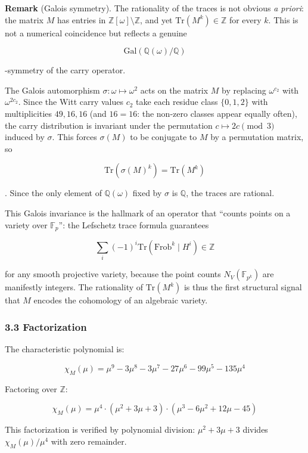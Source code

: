 \documentclass[
  11pt,
]{article}
\begin{document}
\textbf{Remark} (Galois symmetry). The rationality of the traces is not obvious
\emph{a priori}: the matrix \(M\) has entries in
\(\mathbb{Z}[\omega] \setminus \mathbb{Z}\), and yet
\(\mathrm{Tr}(M^k) \in \mathbb{Z}\) for every \(k\). This is not a numerical
coincidence but reflects a genuine

\[\mathrm{Gal}(\mathbb{Q}(\omega)/\mathbb{Q})\]

-symmetry of the carry operator.

The Galois automorphism \(\sigma: \omega \mapsto \omega^2\) acts on the matrix
\(M\) by replacing \(\omega^{c_2}\) with \(\omega^{2c_2}\). Since the Witt carry
values \(c_2\) take each residue class \(\lbrace{}0, 1, 2\rbrace{}\) with
multiplicities \(49, 16, 16\) (and \(16 = 16\): the non-zero classes appear
equally often), the carry distribution is invariant under the permutation
\(c \mapsto 2c \pmod{3}\) induced by \(\sigma\). This forces \(\sigma(M)\) to be
conjugate to \(M\) by a permutation matrix, so

\[\mathrm{Tr}(\sigma(M)^k) = \mathrm{Tr}(M^k)\]

. Since the only element of \(\mathbb{Q}(\omega)\) fixed by \(\sigma\) is
\(\mathbb{Q}\), the traces are rational.

This Galois invariance is the hallmark of an operator that ``counts points on a
variety over \(\mathbb{F}_p\)'': the Lefschetz trace formula guarantees

\[\sum_i (-1)^i \mathrm{Tr}(\mathrm{Frob}^k \mid H^i) \in \mathbb{Z}\]

for any smooth projective variety, because the point counts
\(N_V(\mathbb{F}_{p^k})\) are manifestly integers. The rationality of
\(\mathrm{Tr}(M^k)\) is thus the first structural signal that \(M\) encodes the
cohomology of an algebraic variety.

\subsubsection{3.3 Factorization}\label{factorization}

The characteristic polynomial is:

\[\chi_M(\mu) = \mu^9 - 3\mu^8 - 3\mu^7 - 27\mu^6 - 99\mu^5 - 135\mu^4\]

Factoring over \(\mathbb{Z}\):

\[\chi_M(\mu) = \mu^4 \cdot (\mu^2 + 3\mu + 3) \cdot (\mu^3 - 6\mu^2 + 12\mu - 45)\]

This factorization is verified by polynomial division: \(\mu^2 + 3\mu + 3\)
divides \(\chi_M(\mu)/\mu^4\) with zero remainder.
\end{document}
